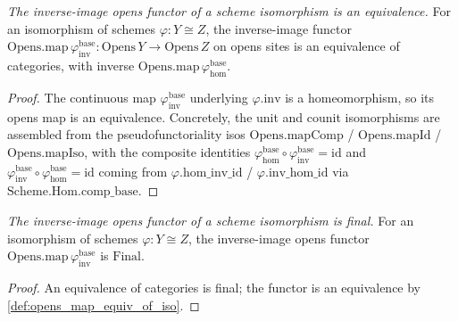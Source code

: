 \begin{definition}

  \label{def:opens_map_equiv_of_iso}
  \textit{The inverse-image opens functor of a scheme isomorphism is an equivalence.}
  For an isomorphism of schemes \(\varphi : Y \cong Z\), the inverse-image functor
  \(\mathrm{Opens.map}\,\varphi_{\mathrm{inv}}^{\mathrm{base}} :
  \mathrm{Opens}\,Y \to \mathrm{Opens}\,Z\) on opens sites is an equivalence of categories, with
  inverse \(\mathrm{Opens.map}\,\varphi_{\mathrm{hom}}^{\mathrm{base}}\).
\end{definition}
\begin{proof}
  The continuous map \(\varphi_{\mathrm{inv}}^{\mathrm{base}}\) underlying \(\varphi.\mathrm{inv}\) is
  a homeomorphism, so its opens map is an equivalence. Concretely, the unit and counit isomorphisms
  are assembled from the pseudofunctoriality isos \(\mathrm{Opens.mapComp}\) / \(\mathrm{Opens.mapId}\)
  / \(\mathrm{Opens.mapIso}\), with the composite identities
  \(\varphi_{\mathrm{hom}}^{\mathrm{base}} \circ \varphi_{\mathrm{inv}}^{\mathrm{base}} = \mathrm{id}\)
  and \(\varphi_{\mathrm{inv}}^{\mathrm{base}} \circ \varphi_{\mathrm{hom}}^{\mathrm{base}} =
  \mathrm{id}\) coming from \(\varphi.\mathrm{hom\_inv\_id}\) / \(\varphi.\mathrm{inv\_hom\_id}\) via
  \(\mathrm{Scheme.Hom.comp\_base}\).
\end{proof}

\begin{lemma}

  \label{lem:opens_map_final_of_scheme_iso}
  \textit{The inverse-image opens functor of a scheme isomorphism is final.}
  For an isomorphism of schemes \(\varphi : Y \cong Z\), the inverse-image opens functor
  \(\mathrm{Opens.map}\,\varphi_{\mathrm{inv}}^{\mathrm{base}}\) is \(\mathrm{Final}\).
\end{lemma}
\begin{proof}
  An equivalence of categories is final; the functor is an equivalence by
  \cref{def:opens_map_equiv_of_iso}.
\end{proof}

